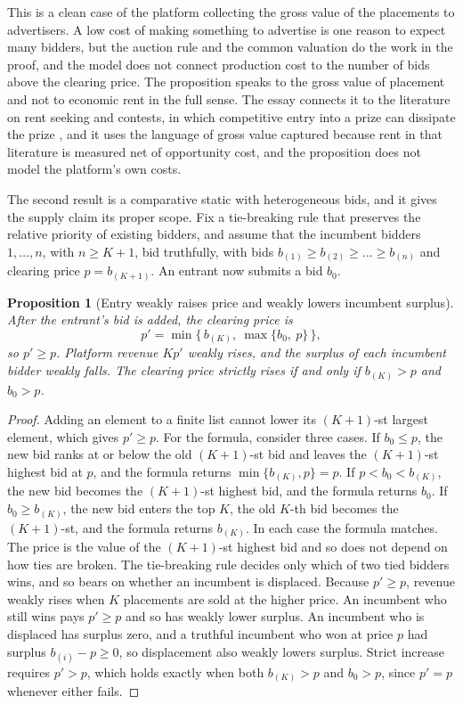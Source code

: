 \documentclass[11pt]{article}
\newtheorem{proposition}{Proposition}
\theoremstyle{definition}
\begin{document}
This is a clean case of the platform collecting the gross value of the placements to advertisers. A low cost of making something to advertise is one reason to expect many bidders, but the auction rule and the common valuation do the work in the proof, and the model does not connect production cost to the number of bids above the clearing price. The proposition speaks to the gross value of placement and not to economic rent in the full sense. The essay connects it to the literature on rent seeking and contests, in which competitive entry into a prize can dissipate the prize \cite{krueger1974,posner1975,tullock1980}, and it uses the language of gross value captured because rent in that literature is measured net of opportunity cost, and the proposition does not model the platform's own costs.

The second result is a comparative static with heterogeneous bids, and it gives the supply claim its proper scope. Fix a tie-breaking rule that preserves the relative priority of existing bidders, and assume that the incumbent bidders $1,\dots,n$, with $n\ge K+1$, bid truthfully, with bids $b_{(1)}\ge b_{(2)}\ge\dots\ge b_{(n)}$ and clearing price $p=b_{(K+1)}$. An entrant now submits a bid $b_0$.

\begin{proposition}[Entry weakly raises price and weakly lowers incumbent surplus]\label{prop:entry}
After the entrant's bid is added, the clearing price is
\[
p'=\min\{\,b_{(K)},\ \max\{b_0,\ p\}\,\},
\]
so $p'\ge p$. Platform revenue $Kp'$ weakly rises, and the surplus of each incumbent bidder weakly falls. The clearing price strictly rises if and only if $b_{(K)}>p$ and $b_0>p$.
\end{proposition}

\begin{proof}
Adding an element to a finite list cannot lower its $(K+1)$-st largest element, which gives $p'\ge p$. For the formula, consider three cases. If $b_0\le p$, the new bid ranks at or below the old $(K+1)$-st bid and leaves the $(K+1)$-st highest bid at $p$, and the formula returns $\min\{b_{(K)},p\}=p$. If $p<b_0<b_{(K)}$, the new bid becomes the $(K+1)$-st highest bid, and the formula returns $b_0$. If $b_0\ge b_{(K)}$, the new bid enters the top $K$, the old $K$-th bid becomes the $(K+1)$-st, and the formula returns $b_{(K)}$. In each case the formula matches. The price is the value of the $(K+1)$-st highest bid and so does not depend on how ties are broken. The tie-breaking rule decides only which of two tied bidders wins, and so bears on whether an incumbent is displaced. Because $p'\ge p$, revenue weakly rises when $K$ placements are sold at the higher price. An incumbent who still wins pays $p'\ge p$ and so has weakly lower surplus. An incumbent who is displaced has surplus zero, and a truthful incumbent who won at price $p$ had surplus $b_{(i)}-p\ge 0$, so displacement also weakly lowers surplus. Strict increase requires $p'>p$, which holds exactly when both $b_{(K)}>p$ and $b_0>p$, since $p'=p$ whenever either fails.
\end{proof}
\end{document}

